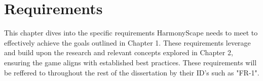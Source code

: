 \documentclass{l4proj}
\begin{document}







\chapter{Requirements}

This chapter dives into the specific requirements HarmonyScape needs to meet to effectively achieve the goals outlined in Chapter 1. These requirements leverage and build upon the research and relevant concepts explored in Chapter 2, ensuring the game aligns with established best practices. These requirements will be reffered to throughout the rest of the dissertation by their ID's such as "FR-1".
\end{document}
